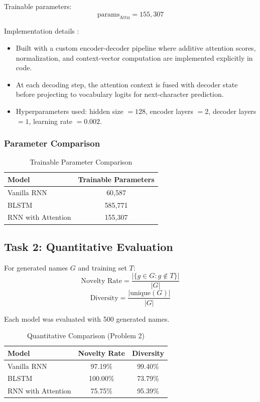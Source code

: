 \documentclass[11pt,a4paper]{article}
\begin{document}
Trainable parameters:
\[
\text{params}_{\text{Attn}} = 155,307
\]

Implementation details :
\begin{itemize}[leftmargin=1.5em]
    \item Built with a custom encoder-decoder pipeline where additive attention scores, normalization, and context-vector computation are implemented explicitly in code.
    \item At each decoding step, the attention context is fused with decoder state before projecting to vocabulary logits for next-character prediction.
    \item Hyperparameters used: hidden size $=128$, encoder layers $=2$, decoder layers $=1$, learning rate $=0.002$.
\end{itemize}

\subsubsection{Parameter Comparison}
\begin{table}[H]
\centering
\caption{Trainable Parameter Comparison}
\small
\begin{tabular}{l c}
\toprule
\textbf{Model} & \textbf{Trainable Parameters} \\
\midrule
Vanilla RNN & 60,587 \\
BLSTM & 585,771 \\
RNN with Attention & 155,307 \\
\bottomrule
\end{tabular}
\end{table}

\subsection{Task 2: Quantitative Evaluation}
For generated names $G$ and training set $T$:
\[
\text{Novelty Rate} = \frac{|\{g \in G : g \notin T\}|}{|G|}
\]
\[
\text{Diversity} = \frac{|\text{unique}(G)|}{|G|}
\]

Each model was evaluated with 500 generated names.

\begin{table}[H]
\centering
\caption{Quantitative Comparison (Problem 2)}
\small
\begin{tabular}{l c c}
\toprule
\textbf{Model} & \textbf{Novelty Rate} & \textbf{Diversity} \\
\midrule
Vanilla RNN & 97.19\% & 99.40\% \\
BLSTM & 100.00\% & 73.79\% \\
RNN with Attention & 75.75\% & 95.39\% \\
\bottomrule
\end{tabular}
\end{table}
\end{document}
